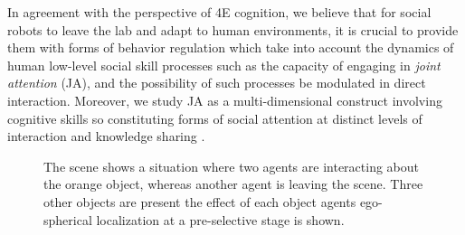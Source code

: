 \documentclass[letterpaper, 10 pt, conference]{ieeeconf}  %
\begin{document}
	In agreement with the perspective of 4E cognition, we believe that for social robots to leave the lab and adapt to human environments, it is crucial to provide them with forms of behavior regulation which take into account the dynamics of human low-level social skill processes such as the capacity of engaging in \textit{joint attention} (JA), and the possibility of such processes be modulated in direct interaction. Moreover, we study JA as a multi-dimensional construct involving cognitive skills so constituting forms of social attention at distinct levels of interaction and knowledge sharing \cite{siposova2019}. 
	
	\begin{figure}[h!]
		\begin{center}
			\caption{The scene shows a situation where two agents are interacting about the orange object, whereas another agent is leaving the scene. Three other objects are present the effect of each object agents ego-spherical localization at a pre-selective stage is shown.}
			\label{fig:multi_robots}
		\end{center}
	\end{figure}
\end{document}
